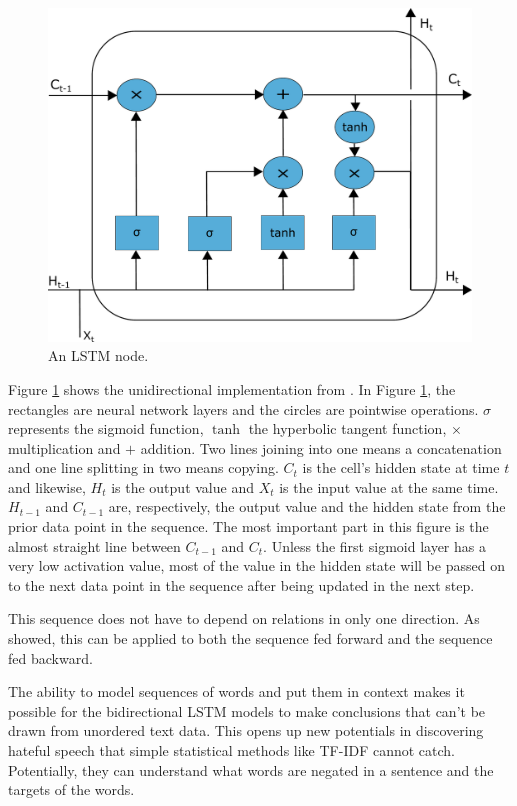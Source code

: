 \documentclass[nofilelist]{cslthse-msc}
\begin{document}
\begin{figure}[ht]
    \centering
    \includegraphics[width=\textwidth]{LSTMnode.pdf}
    \caption{An LSTM node.}
    \label{fig:LSTMnode}
\end{figure}

Figure \ref{fig:LSTMnode} shows the unidirectional implementation from \citet{gers1999learning}. In Figure \ref{fig:LSTMnode}, the rectangles are neural network layers and the circles are pointwise operations.  $\sigma$ represents the sigmoid function, $\tanh$ the hyperbolic tangent function, $\times$ multiplication and $+$ addition. Two lines joining into one means a concatenation and one line splitting in two means copying. $C_t$ is the cell's hidden state at time $t$ and likewise, $H_t$ is the output value and $X_t$ is the input value at the same time. $H_{t-1}$ and $C_{t-1}$ are, respectively, the output value and the hidden state from the prior data point in the sequence. The most important part in this figure is the almost straight line between $C_{t-1}$ and $C_{t}$. Unless the first sigmoid layer has a very low activation value, most of the value in the hidden state will be passed on to the next data point in the sequence after being updated in the next step.

This sequence does not have to depend on relations in only one direction. As \citet{graves2005framewise} showed, this can be applied to both the sequence fed forward and the sequence fed backward. 

The ability to model sequences of words and put them in context makes it possible for the bidirectional LSTM models to make conclusions that can't be drawn from unordered text data. This opens up new potentials in discovering hateful speech that simple statistical methods like TF-IDF cannot catch. Potentially, they can understand what words are negated in a sentence and the targets of the words.
\end{document}
